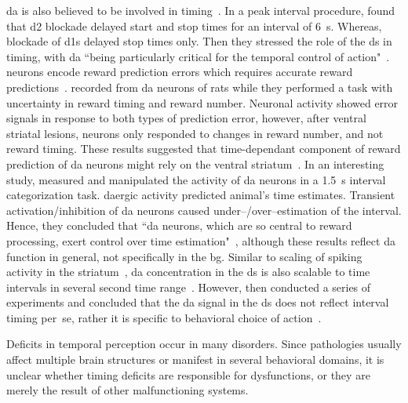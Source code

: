 \Gls{da} is also believed to be involved in timing~\cite{Paton2018NeuronRev}.
In a peak interval procedure\footnotemark,  found that \gls{d2} blockade delayed start and stop times for an interval of 6~s.
Whereas, blockade of \glspl{d1} delayed stop times only.
Then they stressed the role of the \gls{ds} in timing, with \gls{da} ``being particularly critical for the temporal control of action"~\cite{DeCorte2019}.
 neurons encode reward prediction errors which requires accurate reward predictions~\cite[see][]{Berke2018NN}.
 recorded from \gls{da} neurons of rats while they performed a task with uncertainty in reward timing and reward number.
Neuronal activity showed error signals in response to both types of prediction error, however, after ventral striatal lesions, neurons only responded to changes in reward number, and not reward timing.
These results suggested that time-dependant component of reward prediction of \gls{da} neurons might rely on the ventral striatum~\cite{Takahashi2016}.
In an interesting study,  measured and manipulated the activity of \gls{da} neurons in a 1.5~s interval categorization task.
\Gls{da}ergic activity predicted animal's time estimates.
Transient activation/inhibition of \gls{da} neurons caused under--/over--estimation of the interval.
Hence, they concluded that ``\gls{da} neurons, which are so central to reward processing, exert control over time estimation"~\cite{Paton2016Sci}, although these results reflect \gls{da} function in general, not specifically in the \gls{bg}.
Similar to scaling of spiking activity in the striatum~\cite{Mello2015}, \gls{da} concentration in the \gls{ds} is also scalable to time intervals in several second time range~\cite{Howard2017}.
However, \citeauthor{Howard2017} then conducted a series of experiments and concluded that the \gls{da} signal in the \gls{ds} does not reflect interval timing per~se, rather it is specific to behavioral choice of action~\cite{Howard2017}.
\par
Deficits in temporal perception occur in many disorders.
Since pathologies usually affect multiple brain structures or manifest in several behavioral domains, it is unclear whether timing deficits are responsible for dysfunctions, or they are merely the result of other malfunctioning systems.

